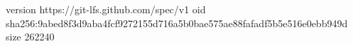 version https://git-lfs.github.com/spec/v1
oid sha256:9abed8f3d9aba4fcf9272155d716a5b0bae575ae88fafadf5b5e516e0ebb949d
size 262240

